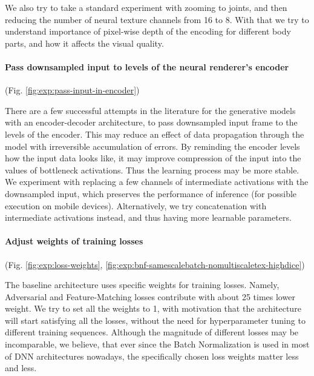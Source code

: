 We also try to take a standard experiment with zooming to joints, and then reducing the number of neural texture channels from 16 to 8. With that we try to understand importance of pixel-wise depth of the encoding for different body parts, and how it affects the visual quality.

\vspace{-15pt}\paragraph{Pass downsampled input to levels of the neural renderer's encoder}(Fig. \ref{fig:exp:pass-input-in-encoder})\mbox{}\nopagebreak

There are a few successful attempts in the literature \cite{dnn:relightable-pointcloud20, dnn:neuralpointgraphics20} for the generative models with an encoder-decoder architecture, to pass downsampled input frame to the levels of the encoder. This may reduce an effect of data propagation through the model with irreversible accumulation of errors. By reminding the encoder levels how the input data looks like, it may improve compression of the input into the values of bottleneck activations. Thus the learning process may be more stable. We experiment with replacing a few channels of intermediate activations with the downsampled input, which preserves the performance of inference (for possible execution on mobile devices). Alternatively, we try concatenation with intermediate activations instead, and thus having more learnable parameters.


\vspace{-15pt}\paragraph{Adjust weights of training losses}(Fig. \ref{fig:exp:loss-weights}, \ref{fig:exp:bnf-samescalebatch-nomultiscaletex-highdice})\mbox{}\nopagebreak

The baseline architecture uses specific weights for training losses. Namely, Adversarial and Feature-Matching losses contribute with about 25 times lower weight. We try to set all the weights to 1, with motivation that the architecture will start satisfying all the losses, without the need for hyperparameter tuning to different training sequences. Although the magnitude of different losses may be incomparable, we believe, that ever since the Batch Normalization is used in most of DNN architectures nowadays, the specifically chosen loss weights matter less and less. 

